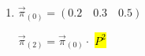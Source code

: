 \documentclass{templateNote}
\begin{document}
\begin{enumerate}[label=\alph*)]
    \item $\vec{\pi}_{(0)} = (0.2 \quad 0.3 \quad 0.5)$
    
    \begin{center}
        $\vec{\pi}_{(2)} = \vec{\pi}_{(0)} \cdot$ \hl{$P^2$}    
    \end{center}
    



\end{enumerate}
\end{document}
